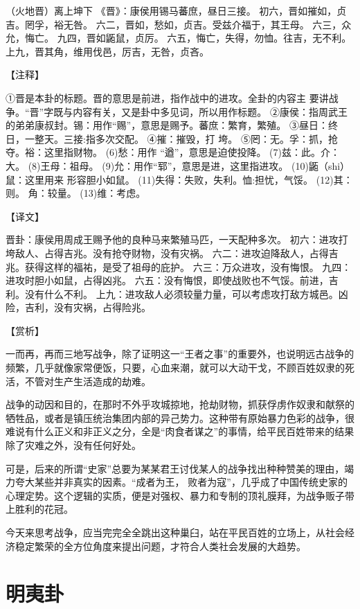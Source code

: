 \documentclass[a4paper,12pt,UTF8,twoside]{ctexbook}
\begin{document}
（火地晋）离上坤下
《晋》：康侯用锡马蕃庶，昼日三接。
初六，晋如摧如，贞吉。罔孚，裕无咎。
六二，晋如，愁如，贞吉。受兹介福于，其王母。
六三，众允，悔亡。
九四，晋如鼫鼠，贞厉。
六五，悔亡，失得，勿恤。往吉，无不利。
上九，晋其角，维用伐邑，厉吉，无咎，贞吝。

【注释】

①晋是本卦的标题。晋的意思是前进，指作战中的进攻。全卦的内容主 要讲战争。“晋”字既与内容有关，又是卦中多见词，所以用作标题。
②康侯：指周武王的弟弟康叔封。锡：用作“赐”，意思是赐予。蕃庶：繁育，繁殖。
③昼日：终日，一整天。三接:指多次交配。
④摧：摧毁，打 垮。
⑤罔：无。孚：抓，抢夺。裕：这里指财物。
(6)愁：用作 “遒”，意思是迫使投降。
(7)兹：此。介：大。
(8)王母：祖母。
(9)允：用作“郓”，意思是进，这里指进攻。
(10)鼫（shi）鼠：这里用来 形容胆小如鼠。
(11)失得：失败，失利。恤:担忧，气馁。
(12)其：则。 角：较量。
(13)维：考虑。

【译文】

晋卦：康侯用周成王赐予他的良种马来繁殖马匹，一天配种多次。
初六：进攻打垮敌人、占得吉兆。没有抢夺财物，没有灾祸。
六二：进攻迫降敌人，占得吉兆。获得这样的福祐，是受了祖母的庇护。
六三：万众进攻，没有悔恨。
九四：进攻时胆小如鼠，占得凶兆。
六五：没有悔恨，即使战败也不气馁。前进，吉利。没有什么不利。
上九：进攻敌人必须较量力量，可以考虑攻打敌方城邑。凶险，吉利，没有灾祸，占得险兆。

【赏析】

一而再，再而三地写战争，除了证明这一“王者之事”的重要外，也说明远古战争的频繁，几乎就像家常便饭，只要，心血来潮，就可以大动干戈，不顾百姓奴隶的死活，不管对生产生活造成的劫难。

战争的动因和目的，在那时不外乎攻城掠地，抢劫财物，抓获俘虏作奴隶和献祭的牺牲品，或者是镇压统治集团内部的异己势力。这种带有原始暴力色彩的战争，很难说有什么正义和非正义之分，全是“肉食者谋之”的事情，给平民百姓带来的结果除了灾难之外，没有任何好处。

可是，后来的所谓“史家”总要为某某君王讨伐某人的战争找出种种赞美的理由，竭力夸大某些并非真实的因素。“成者为王， 败者为寇”，几乎成了中国传统史家的心理定势。这个逻辑的实质，便是对强权、暴力和专制的顶礼膜拜，为战争贩子带上胜利的花冠。

今天来思考战争，应当完完全全跳出这种巢臼，站在平民百姓的立场上，从社会经济稳定繁荣的全方位角度来提出问题，才符合人类社会发展的大趋势。

\chapter{明夷卦}
\end{document}
